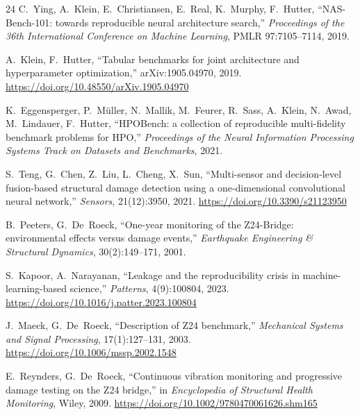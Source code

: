 \documentclass[11pt,a4paper]{article}
\begin{document}
\begin{thebibliography}{24}
C.~Ying, A.~Klein, E.~Christiansen, E.~Real, K.~Murphy, F.~Hutter,
``NAS-Bench-101: towards reproducible neural architecture search,''
\emph{Proceedings of the 36th International Conference on Machine Learning}, PMLR 97:7105--7114, 2019.

A.~Klein, F.~Hutter,
``Tabular benchmarks for joint architecture and hyperparameter optimization,''
arXiv:1905.04970, 2019.
\url{https://doi.org/10.48550/arXiv.1905.04970}

K.~Eggensperger, P.~M\"uller, N.~Mallik, M.~Feurer, R.~Sass, A.~Klein, N.~Awad, M.~Lindauer, F.~Hutter,
``HPOBench: a collection of reproducible multi-fidelity benchmark problems for HPO,''
\emph{Proceedings of the Neural Information Processing Systems Track on Datasets and Benchmarks}, 2021.

S.~Teng, G.~Chen, Z.~Liu, L.~Cheng, X.~Sun,
``Multi-sensor and decision-level fusion-based structural damage detection using a one-dimensional convolutional neural network,''
\emph{Sensors}, 21(12):3950, 2021.
\url{https://doi.org/10.3390/s21123950}

B.~Peeters, G.~De~Roeck,
``One-year monitoring of the Z24-Bridge: environmental effects versus damage events,''
\emph{Earthquake Engineering \& Structural Dynamics}, 30(2):149--171, 2001.

S.~Kapoor, A.~Narayanan,
``Leakage and the reproducibility crisis in machine-learning-based science,''
\emph{Patterns}, 4(9):100804, 2023.
\url{https://doi.org/10.1016/j.patter.2023.100804}

J.~Maeck, G.~De~Roeck,
``Description of Z24 benchmark,''
\emph{Mechanical Systems and Signal Processing}, 17(1):127--131, 2003.
\url{https://doi.org/10.1006/mssp.2002.1548}

E.~Reynders, G.~De~Roeck,
``Continuous vibration monitoring and progressive damage testing on the Z24 bridge,''
in \emph{Encyclopedia of Structural Health Monitoring}, Wiley, 2009.
\url{https://doi.org/10.1002/9780470061626.shm165}

\end{thebibliography}
\end{document}
